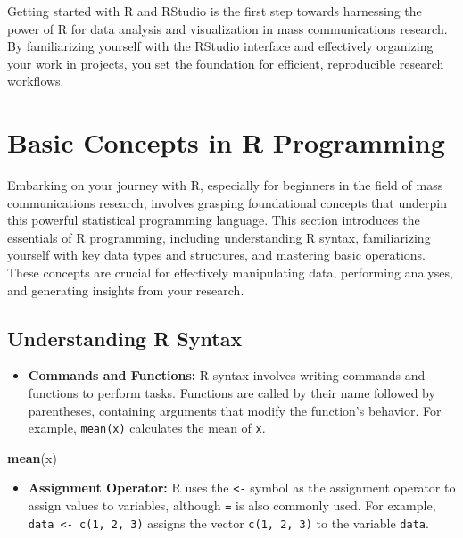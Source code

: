 \documentclass[
]{book}
\newenvironment{Shaded}{\begin{snugshade}}{\end{snugshade}}
\newcommand{\FunctionTok}[1]{\textcolor[rgb]{0.13,0.29,0.53}{\textbf{#1}}}
\newcommand{\NormalTok}[1]{#1}
\providecommand{\tightlist}{%
  \setlength{\itemsep}{0pt}\setlength{\parskip}{0pt}}
\begin{document}
Getting started with R and RStudio is the first step towards harnessing the power of R for data analysis and visualization in mass communications research. By familiarizing yourself with the RStudio interface and effectively organizing your work in projects, you set the foundation for efficient, reproducible research workflows.

\hypertarget{basic-concepts-in-r-programming}{%
\section{Basic Concepts in R Programming}\label{basic-concepts-in-r-programming}}

Embarking on your journey with R, especially for beginners in the field of mass communications research, involves grasping foundational concepts that underpin this powerful statistical programming language. This section introduces the essentials of R programming, including understanding R syntax, familiarizing yourself with key data types and structures, and mastering basic operations. These concepts are crucial for effectively manipulating data, performing analyses, and generating insights from your research.

\hypertarget{understanding-r-syntax}{%
\subsection*{Understanding R Syntax}\label{understanding-r-syntax}}

\begin{itemize}
\tightlist
\item
  \textbf{Commands and Functions:} R syntax involves writing commands and functions to perform tasks. Functions are called by their name followed by parentheses, containing arguments that modify the function's behavior. For example, \texttt{mean(x)} calculates the mean of \texttt{x}.
\end{itemize}

\begin{Shaded}
\begin{Highlighting}[]
\FunctionTok{mean}\NormalTok{(x)}
\end{Highlighting}
\end{Shaded}

\begin{itemize}
\tightlist
\item
  \textbf{Assignment Operator:} R uses the \texttt{\textless{}-} symbol as the assignment operator to assign values to variables, although \texttt{=} is also commonly used. For example, \texttt{data\ \textless{}-\ c(1,\ 2,\ 3)} assigns the vector \texttt{c(1,\ 2,\ 3)} to the variable \texttt{data}.
\end{itemize}
\end{document}
